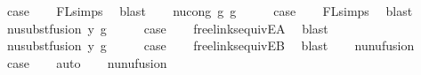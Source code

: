 \begin{isabellebody}
\ {\isacharquery}{\kern0pt}case\isanewline
\ \ \isamarkupfalse%
\ FL{\isachardot}{\kern0pt}simps{\isacharparenleft}{\kern0pt}{}{\isacharparenright}{\kern0pt}\ \isamarkupfalse%
\ blast\isanewline
{}\isamarkupfalse%
\isanewline
\ \ \isamarkupfalse%
\ {\isacharparenleft}{\kern0pt}nu{\isacharunderscore}{\kern0pt}cong\ g\ g{\isacharprime}{\kern0pt}{\isacharparenright}{\kern0pt}\isanewline
\ \ \isamarkupfalse%
\ \isamarkupfalse%
\ {\isacharquery}{\kern0pt}case\isanewline
\ \ \isamarkupfalse%
\ FL{\isachardot}{\kern0pt}simps{\isacharparenleft}{\kern0pt}{}{\isacharparenright}{\kern0pt}\ \isamarkupfalse%
\ blast\isanewline
{}\isamarkupfalse%
\isanewline
\ \ \isamarkupfalse%
\ {\isacharparenleft}{\kern0pt}nu{\isacharunderscore}{\kern0pt}subst{\isacharunderscore}{\kern0pt}fusion{}\ y\ g{\isacharparenright}{\kern0pt}\isanewline
\ \ \isamarkupfalse%
\ \isamarkupfalse%
\ {\isacharquery}{\kern0pt}case\isanewline
\ \ \isamarkupfalse%
\ freelinks{\isacharunderscore}{\kern0pt}equiv{\isacharunderscore}{\kern0pt}E{}A\ \isamarkupfalse%
\ blast\isanewline
{}\isamarkupfalse%
\isanewline
\ \ \isamarkupfalse%
\ {\isacharparenleft}{\kern0pt}nu{\isacharunderscore}{\kern0pt}subst{\isacharunderscore}{\kern0pt}fusion{}\ y\ g{\isacharparenright}{\kern0pt}\isanewline
\ \ \isamarkupfalse%
\ \isamarkupfalse%
\ {\isacharquery}{\kern0pt}case\isanewline
\ \ \isamarkupfalse%
\ freelinks{\isacharunderscore}{\kern0pt}equiv{\isacharunderscore}{\kern0pt}E{}B\ \isamarkupfalse%
\ blast\isanewline
{}\isamarkupfalse%
\isanewline
\ \ \isamarkupfalse%
\ {\isacharparenleft}{\kern0pt}nu{\isacharunderscore}{\kern0pt}nu{\isacharunderscore}{\kern0pt}fusion{}{\isacharparenright}{\kern0pt}\isanewline
\ \ \isamarkupfalse%
\ \isamarkupfalse%
\ {\isacharquery}{\kern0pt}case\isanewline
\ \ \isamarkupfalse%
\ auto\isanewline
{}\isamarkupfalse%
\isanewline
\ \ \isamarkupfalse%
\ {\isacharparenleft}{\kern0pt}nu{\isacharunderscore}{\kern0pt}nu{\isacharunderscore}{\kern0pt}fusion{}{\isacharparenright}{\kern0pt}\isanewline

\end{isabellebody}
